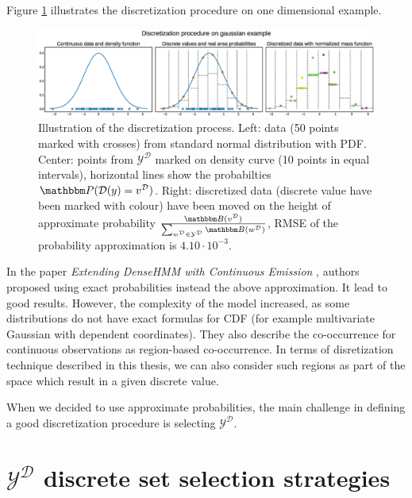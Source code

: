 \documentclass[shortabstract]{iithesis}
\begin{document}
Figure \ref{fig:1d_discrete} illustrates the discretization procedure on one dimensional example.

\begin{figure}[!ht]
    \centering
    \includegraphics[scale=0.35]{discretization_image.eps}
    \caption{Illustration of the discretization process. Left: data (50 points marked with crosses) from standard normal distribution with PDF. Center: points from $\mathcal{Y^{\mathcal{D}}}$ marked on density curve (10 points in equal intervals), horizontal lines show the probabilties \linebreak $\mathbbm P (\mathcal D (y) = v^{\mathcal D})$. Right: discretized data (discrete value have been marked with colour) have been moved on the height of approximate probability $\frac{\mathbbm B(v^{\mathcal D})}{\sum_{w^{\mathcal D} \in \mathcal{Y^{\mathcal D}}} \mathbbm B(w^{\mathcal D})}$, RMSE of the probability approximation is $4.10 \cdot 10^{-3}$.}
    \label{fig:1d_discrete}
\end{figure}

In the paper \textit{Extending DenseHMM with Continuous Emission} \cite{balcerek}, authors proposed using exact probabilities instead the above approximation. It lead to good results. However, the complexity of the model increased, as some distributions do not have exact formulas for CDF (for example multivariate Gaussian with dependent coordinates). They also describe the co-occurrence for continuous observations as region-based co-occurrence. In terms of disretization technique described in this thesis, we can also consider such regions as part of the space which result in a given discrete value. 

When we decided to use approximate probabilities, the main challenge in defining a good discretization procedure is selecting $\mathcal{Y}^{\mathcal{D}}$. 


\section{$\mathcal{Y}^{\mathcal{D}}$  
discrete set selection strategies} \label{sec:discr_ys}
\end{document}
